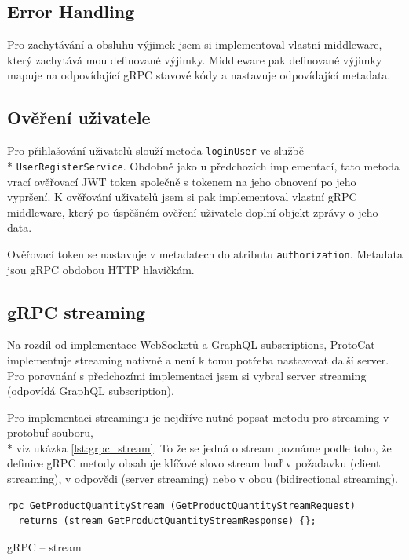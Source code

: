 \documentclass[thesis=M,czech]{FITthesis}[2019/12/23]
\begin{document}
\subsection{Error Handling}
Pro zachytávání a obsluhu výjimek jsem si implementoval vlastní middleware, který zachytává mou definované výjimky. Middleware pak definované výjimky mapuje na odpovídající gRPC stavové kódy a nastavuje odpovídající metadata.

\subsection{Ověření uživatele}
Pro přihlašování uživatelů slouží metoda \texttt{loginUser} ve službě \\* \texttt{UserRegisterService}. Obdobně jako u předchozích implementací, tato metoda vrací ověřovací JWT token společně s tokenem na jeho obnovení po jeho vypršení. K ověřování uživatelů jsem si pak implementoval vlastní gRPC middleware, který po úspěšném ověření uživatele doplní objekt zprávy o jeho data.

Ověřovací token se nastavuje v metadatech do atributu \texttt{authorization}. Metadata jsou gRPC obdobou HTTP hlavičkám.

\subsection{gRPC streaming}
Na rozdíl od implementace WebSocketů a GraphQL subscriptions, ProtoCat implementuje streaming nativně a není k tomu potřeba nastavovat další server. Pro porovnání s předchozími implementaci jsem si vybral server streaming (odpovídá GraphQL subscription).

Pro implementaci streamingu je nejdříve nutné popsat metodu pro streaming v protobuf souboru, \\* viz ukázka \ref{lst:grpc_stream}. To že se jedná o stream poznáme podle toho, že definice gRPC metody obsahuje klíčové slovo stream buď v požadavku (client streaming), v odpovědi (server streaming) nebo v obou (bidirectional streaming).

\begin{listing}
\begin{verbatim}
rpc GetProductQuantityStream (GetProductQuantityStreamRequest)
  returns (stream GetProductQuantityStreamResponse) {};
\end{verbatim}
\caption{gRPC -- stream}
\label{lst:grpc_stream}
\end{listing}
\end{document}
